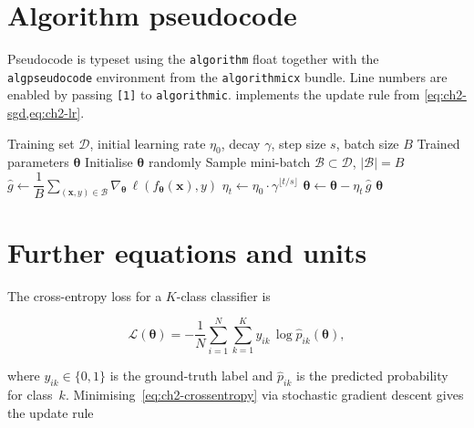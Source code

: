 \section{Algorithm pseudocode}

Pseudocode is typeset using the \texttt{algorithm} float together
with the \texttt{algpseudocode} environment from the
\texttt{algorithmicx} bundle.
Line numbers are enabled by passing \texttt{[1]} to
\texttt{algorithmic}.
 implements the update rule from
\cref{eq:ch2-sgd,eq:ch2-lr}.

\begin{algorithm}[t]
  \caption{Mini-batch stochastic gradient descent}
  \label{alg:sgd}
  \begin{algorithmic}[1]
    \Require Training set $\mathcal{D}$, initial learning rate
             $\eta_{0}$, decay $\gamma$, step size $s$, batch
             size $B$
    \Ensure  Trained parameters $\boldsymbol{\theta}$
    \State Initialise $\boldsymbol{\theta}$ randomly
      \State Sample mini-batch
             $\mathcal{B} \subset \mathcal{D}$,\;
             $|\mathcal{B}| = B$
      \State $\hat{g} \gets \dfrac{1}{B}
             \displaystyle\sum_{(\mathbf{x},y)\in\mathcal{B}}
             \nabla_{\!\boldsymbol{\theta}}\,
             \ell\!\left(f_{\boldsymbol{\theta}}(\mathbf{x}),
             y\right)$
      \State $\eta_{t} \gets \eta_{0}\cdot
             \gamma^{\lfloor t/s \rfloor}$
      \State $\boldsymbol{\theta} \gets \boldsymbol{\theta}
             - \eta_{t}\,\hat{g}$
    \EndFor
    \State \Return $\boldsymbol{\theta}$
  \end{algorithmic}
\end{algorithm}

\section{Further equations and units}

The cross-entropy loss for a $K$-class classifier is

\begin{equation}
  \mathcal{L}(\boldsymbol{\theta}) =
  -\frac{1}{N}\sum_{i=1}^{N}
    \sum_{k=1}^{K} y_{ik}\,\log\hat{p}_{ik}(\boldsymbol{\theta}),
  \label{eq:ch2-crossentropy}
\end{equation}

where $y_{ik} \in \{0,1\}$ is the ground-truth label and
$\hat{p}_{ik}$ is the predicted probability for class~$k$.
Minimising~\eqref{eq:ch2-crossentropy} via stochastic gradient
descent gives the update rule

